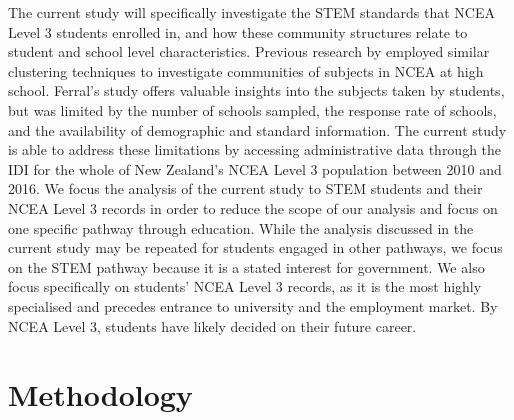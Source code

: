 The current study will specifically investigate the STEM standards that NCEA Level 3 students enrolled in, and how these community structures relate to student and school level characteristics. Previous research by  \citet{ferral2005clustering} employed similar clustering techniques to investigate communities of subjects in NCEA at high school. Ferral's study offers valuable insights into the subjects taken by students, but was limited by the number of schools sampled, the response rate of schools, and the availability of demographic and standard information. The current study is able to address these limitations by accessing administrative data through the IDI for the whole of New Zealand's NCEA Level 3 population between 2010 and 2016. We focus the analysis of the current study to STEM students and their NCEA Level 3 records in order to reduce the scope of our analysis and focus on one specific pathway through education. While the analysis discussed in the current study may be repeated for students engaged in other pathways, we focus on the STEM pathway because it is a stated interest for government. We also focus specifically on students' NCEA Level 3 records, as it is the most highly specialised and precedes entrance to university and the employment market. By NCEA Level 3, students have likely decided on their future career.

\section{Methodology}
